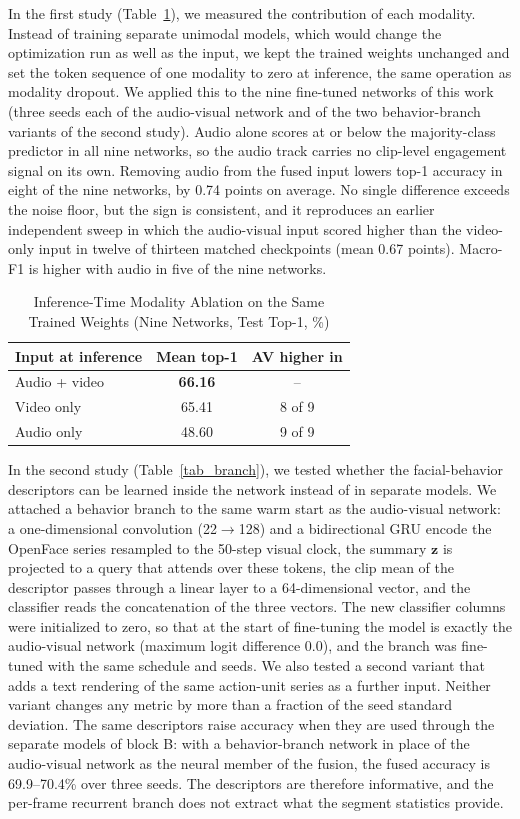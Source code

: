 \documentclass[journal]{IEEEtran}
\begin{document}
In the first study (Table~\ref{tab_modality}), we measured the contribution of each modality. Instead of training separate unimodal models, which would change the optimization run as well as the input, we kept the trained weights unchanged and set the token sequence of one modality to zero at inference, the same operation as modality dropout. We applied this to the nine fine-tuned networks of this work (three seeds each of the audio-visual network and of the two behavior-branch variants of the second study). Audio alone scores at or below the majority-class predictor in all nine networks, so the audio track carries no clip-level engagement signal on its own. Removing audio from the fused input lowers top-1 accuracy in eight of the nine networks, by 0.74 points on average. No single difference exceeds the noise floor, but the sign is consistent, and it reproduces an earlier independent sweep in which the audio-visual input scored higher than the video-only input in twelve of thirteen matched checkpoints (mean 0.67 points). Macro-F1 is higher with audio in five of the nine networks.

\begin{table}[!t]
\setlength{\tabcolsep}{3pt}
\renewcommand{\arraystretch}{1.2}
\caption{Inference-Time Modality Ablation on the Same Trained Weights (Nine Networks, Test Top-1, \%)}
\label{tab_modality}
\centering
\begin{tabular}{lcc}
\hline
Input at inference & Mean top-1 & AV higher in\\
\hline
Audio + video & \textbf{66.16} & --\\
Video only & 65.41 & 8 of 9\\
Audio only & 48.60 & 9 of 9\\
\hline
\end{tabular}
\end{table}

In the second study (Table~\ref{tab_branch}), we tested whether the facial-behavior descriptors can be learned inside the network instead of in separate models. We attached a behavior branch to the same warm start as the audio-visual network: a one-dimensional convolution (22$\to$128) and a bidirectional GRU encode the OpenFace series resampled to the 50-step visual clock, the summary $\mathbf{z}$ is projected to a query that attends over these tokens, the clip mean of the descriptor passes through a linear layer to a 64-dimensional vector, and the classifier reads the concatenation of the three vectors. The new classifier columns were initialized to zero, so that at the start of fine-tuning the model is exactly the audio-visual network (maximum logit difference 0.0), and the branch was fine-tuned with the same schedule and seeds. We also tested a second variant that adds a text rendering of the same action-unit series as a further input. Neither variant changes any metric by more than a fraction of the seed standard deviation. The same descriptors raise accuracy when they are used through the separate models of block B: with a behavior-branch network in place of the audio-visual network as the neural member of the fusion, the fused accuracy is 69.9--70.4\% over three seeds. The descriptors are therefore informative, and the per-frame recurrent branch does not extract what the segment statistics provide.
\end{document}
